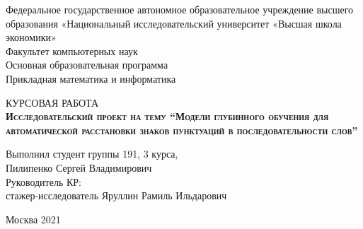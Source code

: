 \begin{titlepage}
\newpage

{
\begin{center}
Федеральное государственное автономное образовательное учреждение высшего образования «Национальный исследовательский университет «Высшая школа экономики»
\\
\bigskip
Факультет компьютерных наук \\
Основная образовательная программа \\
Прикладная математика и информатика \\
\end{center}
}

\vspace{8em}

\begin{center}
{\Large КУРСОВАЯ РАБОТА}\\
\textsc{\textbf{
Исследовательский проект на тему
\linebreak
\enquote{Модели глубинного обучения для автоматической расстановки знаков пунктуаций в последовательности слов}}}
\end{center}

\vspace{2em}

{
\hfill\parbox{16cm}{
\hspace*{5cm}\hspace*{-5cm}Выполнил студент группы 191, 3 курса,\\
 Пилипенко Сергей Владимирович\\
 
\hspace*{5cm}\hspace*{-5cm}Руководитель КР:\\
стажер-исследователь Яруллин Рамиль Ильдарович\\


}
}

\vspace{\fill}

\begin{center}
Москва 2021
\end{center}

\end{titlepage}